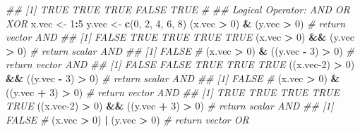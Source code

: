 \documentclass[
]{book}
\newenvironment{Shaded}{\begin{snugshade}}{\end{snugshade}}
\newcommand{\CommentTok}[1]{\textcolor[rgb]{0.56,0.35,0.01}{\textit{#1}}}
\newcommand{\DecValTok}[1]{\textcolor[rgb]{0.00,0.00,0.81}{#1}}
\newcommand{\KeywordTok}[1]{\textcolor[rgb]{0.13,0.29,0.53}{\textbf{#1}}}
\newcommand{\NormalTok}[1]{#1}
\newcommand{\OperatorTok}[1]{\textcolor[rgb]{0.81,0.36,0.00}{\textbf{#1}}}
\newcommand{\StringTok}[1]{\textcolor[rgb]{0.31,0.60,0.02}{#1}}
\begin{document}
\begin{Shaded}
\begin{Highlighting}[]
\CommentTok{\#\# [1]  TRUE  TRUE  TRUE FALSE  TRUE}
\CommentTok{\#}
\CommentTok{\#\# Logical Operator: AND OR XOR}
\NormalTok{x.vec \textless{}{-}}\StringTok{ }\DecValTok{1}\OperatorTok{:}\DecValTok{5}
\NormalTok{y.vec \textless{}{-}}\StringTok{ }\KeywordTok{c}\NormalTok{(}\DecValTok{0}\NormalTok{, }\DecValTok{2}\NormalTok{, }\DecValTok{4}\NormalTok{, }\DecValTok{6}\NormalTok{, }\DecValTok{8}\NormalTok{)}
\NormalTok{(x.vec }\OperatorTok{\textgreater{}}\StringTok{ }\DecValTok{0}\NormalTok{) }\OperatorTok{\&}\StringTok{  }\NormalTok{(y.vec }\OperatorTok{\textgreater{}}\StringTok{ }\DecValTok{0}\NormalTok{)  }\CommentTok{\# return vector AND}
\CommentTok{\#\# [1] FALSE  TRUE  TRUE  TRUE  TRUE}
\NormalTok{(x.vec }\OperatorTok{\textgreater{}}\StringTok{ }\DecValTok{0}\NormalTok{) }\OperatorTok{\&\&}\StringTok{ }\NormalTok{(y.vec }\OperatorTok{\textgreater{}}\StringTok{ }\DecValTok{0}\NormalTok{)  }\CommentTok{\# return scalar AND}
\CommentTok{\#\# [1] FALSE}
\CommentTok{\#}
\NormalTok{(x.vec }\OperatorTok{\textgreater{}}\StringTok{ }\DecValTok{0}\NormalTok{) }\OperatorTok{\&}\StringTok{  }\NormalTok{((y.vec }\OperatorTok{{-}}\StringTok{ }\DecValTok{3}\NormalTok{) }\OperatorTok{\textgreater{}}\StringTok{ }\DecValTok{0}\NormalTok{)     }\CommentTok{\# return vector AND}
\CommentTok{\#\# [1] FALSE FALSE  TRUE  TRUE  TRUE}
\NormalTok{((x.vec}\DecValTok{{-}2}\NormalTok{) }\OperatorTok{\textgreater{}}\StringTok{ }\DecValTok{0}\NormalTok{) }\OperatorTok{\&\&}\StringTok{ }\NormalTok{((y.vec }\OperatorTok{{-}}\StringTok{ }\DecValTok{3}\NormalTok{) }\OperatorTok{\textgreater{}}\StringTok{ }\DecValTok{0}\NormalTok{) }\CommentTok{\# return scalar AND}
\CommentTok{\#\# [1] FALSE}
\CommentTok{\#}
\NormalTok{(x.vec }\OperatorTok{\textgreater{}}\StringTok{ }\DecValTok{0}\NormalTok{) }\OperatorTok{\&}\StringTok{  }\NormalTok{((y.vec }\OperatorTok{+}\StringTok{ }\DecValTok{3}\NormalTok{) }\OperatorTok{\textgreater{}}\StringTok{ }\DecValTok{0}\NormalTok{)     }\CommentTok{\# return vector AND}
\CommentTok{\#\# [1] TRUE TRUE TRUE TRUE TRUE}
\NormalTok{((x.vec}\DecValTok{{-}2}\NormalTok{) }\OperatorTok{\textgreater{}}\StringTok{ }\DecValTok{0}\NormalTok{) }\OperatorTok{\&\&}\StringTok{ }\NormalTok{((y.vec }\OperatorTok{+}\StringTok{ }\DecValTok{3}\NormalTok{) }\OperatorTok{\textgreater{}}\StringTok{ }\DecValTok{0}\NormalTok{) }\CommentTok{\# return scalar AND}
\CommentTok{\#\# [1] FALSE}
\CommentTok{\#}
\NormalTok{(x.vec }\OperatorTok{\textgreater{}}\StringTok{ }\DecValTok{0}\NormalTok{) }\OperatorTok{|}\StringTok{ }\NormalTok{(y.vec }\OperatorTok{\textgreater{}}\StringTok{ }\DecValTok{0}\NormalTok{) }\CommentTok{\# return vector OR}

\end{Highlighting}
\end{Shaded}
\end{document}
